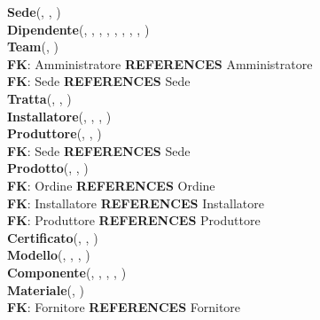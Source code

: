 \documentclass{article}
\begin{document}
\textbf{Sede}(\underline{}, , )\\


\textbf{Dipendente}(\underline{}, , , , , , , , )\\


\textbf{Team}(\underline{}, )\\
\indent\indent \textbf{FK}: Amministratore \textbf{REFERENCES} Amministratore\\
\indent\indent \textbf{FK}: Sede \textbf{REFERENCES} Sede\\


\textbf{Tratta}(\underline{}, , )\\


\textbf{Installatore}(\underline{}, , , )\\


\textbf{Produttore}(\underline{}, , )\\
\indent\indent \textbf{FK}: Sede \textbf{REFERENCES} Sede\\


\textbf{Prodotto}(\underline{}, , )\\
\indent\indent \textbf{FK}: Ordine \textbf{REFERENCES} Ordine\\
\indent\indent \textbf{FK}: Installatore \textbf{REFERENCES} Installatore\\
\indent\indent \textbf{FK}: Produttore \textbf{REFERENCES} Produttore\\


\textbf{Certificato}(\underline{}, , )\\


\textbf{Modello}(\underline{}, , , )\\


\textbf{Componente}(\underline{}, , , , )\\


\textbf{Materiale}(\underline{}, )\\
\indent\indent \textbf{FK}: Fornitore \textbf{REFERENCES} Fornitore\\
\end{document}
